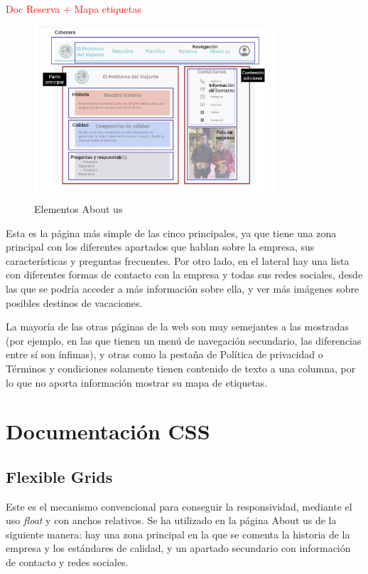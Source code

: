 \documentclass[11pt, a4paper]{book}
\begin{document}
	\begin{Huge}
		\textcolor{red}{Doc Reserva + Mapa etiquetas}
	\end{Huge}

	\begin{figure} [H]
		\centering
		\includegraphics[width=0.8\textwidth]{HTML/Doc-about_us.jpg}
		\caption{Elementos About us}
	\end{figure}

	Esta es la página más simple de las cinco principales, ya que tiene una zona principal con los diferentes apartados que hablan sobre la empresa, sus características y preguntas frecuentes. Por otro lado, en el lateral hay una lista con diferentes formas de contacto con la empresa y todas sus redes sociales, desde las que se podría acceder a más información sobre ella, y ver más imágenes sobre posibles destinos de vacaciones.
	
	
	La mayoría de las otras páginas de la web son muy semejantes a las mostradas (por ejemplo, en las que tienen un menú de navegación secundario, las diferencias entre sí son ínfimas), y otras como la pestaña de Política de privacidad o Términos y condiciones solamente tienen contenido de texto a una columna, por lo que no aporta información mostrar su mapa de etiquetas.
	
	
	
	
	
	
	
	\chapter{Documentación CSS}
	
	\section{Flexible Grids}
	Este es el mecanismo convencional para conseguir la responsividad, mediante el uso \textit{float} y con anchos relativos. Se ha utilizado en la página About us de la siguiente manera: hay una zona principal en la que se comenta la historia de la empresa y los estándares de calidad, y un apartado secundario con información de contacto y redes sociales.
	
\end{document}
